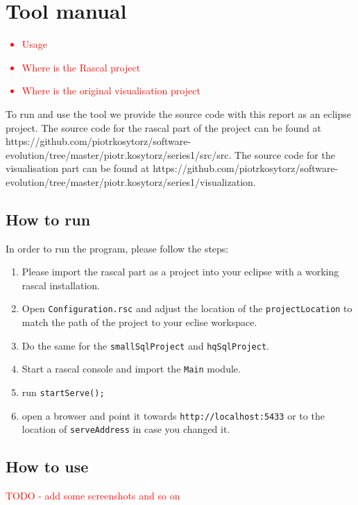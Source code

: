 \documentclass{uva-inf-article}
\newcommand\todo[1]{\textcolor{red}{#1}}
\begin{document}
\section{Tool manual}
\todo {
	\begin{itemize}
		\item{Usage}	
		\item{Where is the Rascal project}
		\item{Where is the original visualisation project }
	\end{itemize}
}

To run and use the tool we provide the source code with this report as an eclipse project. The source code for the rascal part of the project can be found at https://github.com/piotrkosytorz/software-evolution/tree/master/piotr.kosytorz/series1/src/src. The source code for the visualisation part can be found at https://github.com/piotrkosytorz/software-evolution/tree/master/piotr.kosytorz/series1/visualization.

\subsection{How to run}

In order to run the program, please follow the steps:

\begin{enumerate}
\item Please import the rascal part as a project into your eclipse with a working rascal installation.
\item
  Open \texttt{Configuration.rsc} and adjust the location of the \texttt{projectLocation} to match the path of the project to your eclise workspace.
\item Do the same for the \texttt{smallSqlProject} and \texttt{hqSqlProject}.
\item Start a rascal console and import the \texttt{Main} module.
\item run \texttt{startServe();}
\item open a browser and point it towards \texttt{http://localhost:5433} or to the location of \texttt{serveAddress} in case you changed it.
\end{enumerate}

\subsection{How to use}

\todo{TODO - add some screenshots and so on}
\end{document}
